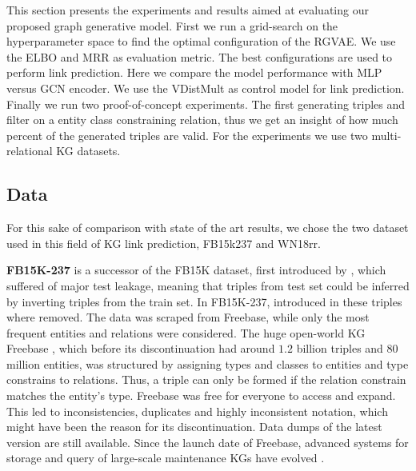 
This section presents the experiments and results aimed at evaluating our proposed graph generative model. First we run a grid-search on the hyperparameter space to find the optimal configuration of the RGVAE. We use the ELBO and MRR as evaluation metric. The best configurations are used to perform link prediction. Here we compare the model performance with MLP versus GCN encoder. We use the VDistMult as control model for link prediction. Finally we run two proof-of-concept experiments. The first generating triples and filter on a entity class constraining relation, thus we get an insight of how much percent of the generated triples are valid. For the experiments we use two multi-relational KG datasets.



\subsection{Data}
\label{ssec5:data}
For this sake of comparison with state of the art results, we chose the two dataset used in this field of KG link prediction, FB15k237 and WN18rr.


\textbf{FB15K-237} is a successor of the FB15K dataset, first introduced by \cite{bordes_translating_2013}, which suffered of major test leakage, meaning that triples from test set could be inferred by inverting triples from the train set. In FB15K-237, introduced in \cite{toutanova_representing_2015} these triples where removed.
The data was scraped from Freebase, while only the most frequent entities and relations were considered. The huge open-world KG Freebase \cite{bollacker_freebase_2008}, which before its discontinuation had around $1.2$ billion triples and $80$ million entities, was structured by assigning types and classes to entities and type constrains to relations. Thus, a triple can only be formed if the relation constrain matches the entity's type. Freebase was free for everyone to access and expand. This led to inconsistencies, duplicates and highly inconsistent notation, which might have been the reason for its discontinuation. Data dumps of the latest version are still available. Since the launch date of Freebase, advanced systems for storage and query of large-scale maintenance KGs have evolved \cite{cudre2013nosql}.







